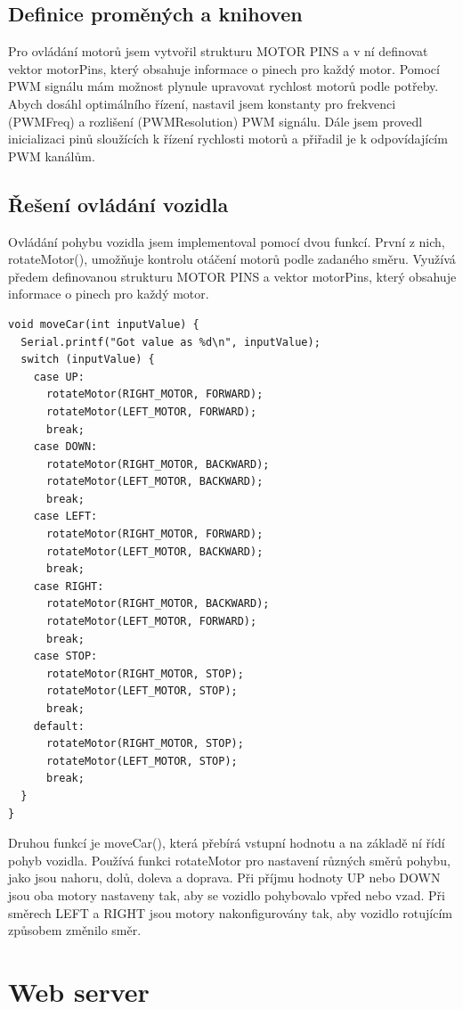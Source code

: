 \documentclass[12pt, a4paper,
oneside,      %
openany
]{report}
\begin{document}
\subsection{Definice proměných a knihoven}
\noindent Pro ovládání motorů jsem vytvořil strukturu MOTOR PINS a v ní definovat vektor motorPins, který obsahuje informace o pinech pro každý motor. Pomocí PWM signálu mám možnost plynule upravovat rychlost motorů podle potřeby. Abych dosáhl optimálního řízení, nastavil jsem konstanty pro frekvenci (PWMFreq) a rozlišení (PWMResolution) PWM signálu. Dále jsem provedl inicializaci pinů sloužících k řízení rychlosti motorů a přiřadil je k odpovídajícím PWM kanálům.
\subsection{Řešení ovládání vozidla}
\noindent Ovládání pohybu vozidla jsem implementoval pomocí dvou funkcí. První z nich, rotateMotor(), umožňuje kontrolu otáčení motorů podle zadaného směru. Využívá předem definovanou strukturu MOTOR PINS a vektor motorPins, který obsahuje informace o pinech pro každý motor.
\begin{lstlisting}[caption={Příklad funkce moveCar()}, label=lst:arduino]
void moveCar(int inputValue) {
  Serial.printf("Got value as %d\n", inputValue);
  switch (inputValue) {
    case UP:
      rotateMotor(RIGHT_MOTOR, FORWARD);
      rotateMotor(LEFT_MOTOR, FORWARD);
      break;
    case DOWN:
      rotateMotor(RIGHT_MOTOR, BACKWARD);
      rotateMotor(LEFT_MOTOR, BACKWARD);
      break;
    case LEFT:
      rotateMotor(RIGHT_MOTOR, FORWARD);
      rotateMotor(LEFT_MOTOR, BACKWARD);
      break;
    case RIGHT:
      rotateMotor(RIGHT_MOTOR, BACKWARD);
      rotateMotor(LEFT_MOTOR, FORWARD);
      break;
    case STOP:
      rotateMotor(RIGHT_MOTOR, STOP);
      rotateMotor(LEFT_MOTOR, STOP);
      break;
    default:
      rotateMotor(RIGHT_MOTOR, STOP);
      rotateMotor(LEFT_MOTOR, STOP);
      break;
  }
}
\end{lstlisting}
\newpage
\noindent Druhou funkcí je moveCar(), která přebírá vstupní hodnotu a na základě ní řídí pohyb vozidla. Používá funkci rotateMotor pro nastavení různých směrů pohybu, jako jsou nahoru, dolů, doleva a doprava. Při příjmu hodnoty UP nebo DOWN jsou oba motory nastaveny tak, aby se vozidlo pohybovalo vpřed nebo vzad. Při směrech LEFT a RIGHT jsou motory nakonfigurovány tak, aby vozidlo rotujícím způsobem změnilo směr.

\section{Web server}
\end{document}
